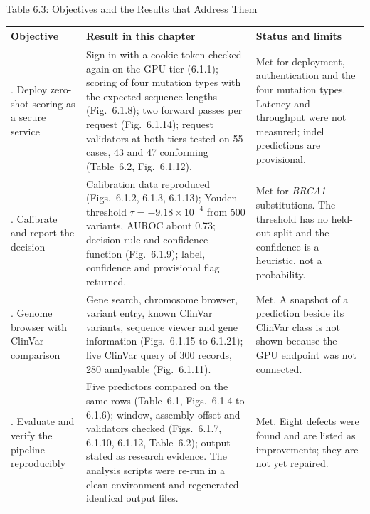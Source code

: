 \begin{table}[!t]\centering\label{tab:6.3}
Table 6.3: Objectives and the Results that Address Them\par\vspace{4pt}
\begingroup\fontsize{10.5}{12.5}\selectfont\renewcommand{\baselinestretch}{1.05}\selectfont
\renewcommand{\arraystretch}{1.4}
\noindent\begin{tabular}{|>{\raggedright\arraybackslash}p{74pt}|>{\raggedright\arraybackslash}p{228pt}|>{\raggedright\arraybackslash}p{128pt}|}
\hline
Objective & Result in this chapter & Status and limits \\
\hline
1. Deploy zero-shot scoring as a secure service & Sign-in with a cookie token checked again on the GPU tier (6.1.1); scoring of four mutation types with the expected sequence lengths (Fig.~6.1.8); two forward passes per request (Fig.~6.1.14); request validators at both tiers tested on 55 cases, 43 and 47 conforming (Table~6.2, Fig.~6.1.12). & Met for deployment, authentication and the four mutation types. Latency and throughput were not measured; indel predictions are provisional. \\
\hline
2. Calibrate and report the decision & Calibration data reproduced (Figs.~6.1.2, 6.1.3, 6.1.13); Youden threshold $\tau=-9.18\times10^{-4}$ from 500 variants, AUROC about 0.73; decision rule and confidence function (Fig.~6.1.9); label, confidence and provisional flag returned. & Met for \textit{BRCA1} substitutions. The threshold has no held-out split and the confidence is a heuristic, not a probability. \\
\hline
3. Genome browser with ClinVar comparison & Gene search, chromosome browser, variant entry, known ClinVar variants, sequence viewer and gene information (Figs.~6.1.15 to 6.1.21); live ClinVar query of 300 records, 280 analysable (Fig.~6.1.11). & Met. A snapshot of a prediction beside its ClinVar class is not shown because the GPU endpoint was not connected. \\
\hline
4. Evaluate and verify the pipeline reproducibly & Five predictors compared on the same rows (Table~6.1, Figs.~6.1.4 to 6.1.6); window, assembly offset and validators checked (Figs.~6.1.7, 6.1.10, 6.1.12, Table~6.2); output stated as research evidence. The analysis scripts were re-run in a clean environment and regenerated identical output files. & Met. Eight defects were found and are listed as improvements; they are not yet repaired. \\
\hline
\end{tabular}
\endgroup
\end{table}


